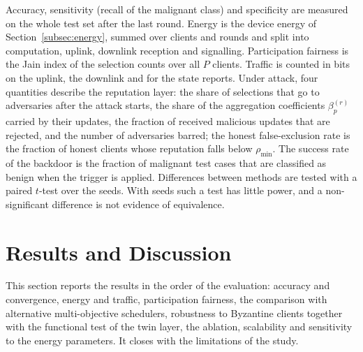 Accuracy, sensitivity (recall of the malignant class) and specificity are measured on the whole test set after the last round. Energy is the device energy of Section~\ref{subsec:energy}, summed over clients and rounds and split into computation, uplink, downlink reception and signalling. Participation fairness is the Jain index of the selection counts over all $P$ clients. Traffic is counted in bits on the uplink, the downlink and for the state reports. Under attack, four quantities describe the reputation layer: the share of selections that go to adversaries after the attack starts, the share of the aggregation coefficients $\beta_p^{(r)}$ carried by their updates, the fraction of received malicious updates that are rejected, and the number of adversaries barred; the honest false-exclusion rate is the fraction of honest clients whose reputation falls below $\rho_{\min}$. The success rate of the backdoor is the fraction of malignant test cases that are classified as benign when the trigger is applied. Differences between methods are tested with a paired $t$-test over the seeds. With  seeds such a test has little power, and a non-significant difference is not evidence of equivalence.

\FloatBarrier
\section{Results and Discussion}
\label{sec:results}
This section reports the results in the order of the evaluation: accuracy and convergence, energy and traffic, participation fairness, the comparison with alternative multi-objective schedulers, robustness to Byzantine clients together with the functional test of the twin layer, the ablation, scalability and sensitivity to the energy parameters. It closes with the limitations of the study.

